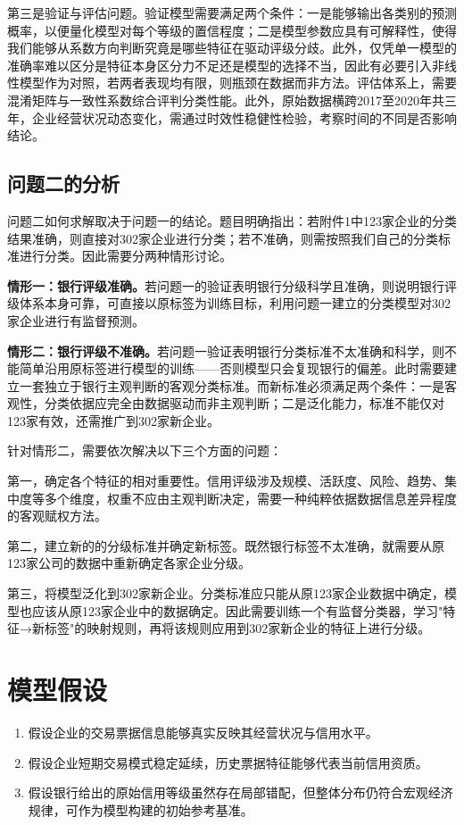 \documentclass[12pt,a4paper,AutoFakeBold=2]{ctexart}
\begin{document}
第三是验证与评估问题。验证模型需要满足两个条件：一是能够输出各类别的预测概率，以便量化模型对每个等级的置信程度；二是模型参数应具有可解释性，使得我们能够从系数方向判断究竟是哪些特征在驱动评级分歧。此外，仅凭单一模型的准确率难以区分是特征本身区分力不足还是模型的选择不当，因此有必要引入非线性模型作为对照，若两者表现均有限，则瓶颈在数据而非方法。评估体系上，需要混淆矩阵与一致性系数综合评判分类性能。此外，原始数据横跨2017至2020年共三年，企业经营状况动态变化，需通过时效性稳健性检验，考察时间的不同是否影响结论。

\subsection{问题二的分析}

问题二如何求解取决于问题一的结论。题目明确指出：若附件1中123家企业的分类结果准确，则直接对302家企业进行分类；若不准确，则需按照我们自己的分类标准进行分类。因此需要分两种情形讨论。

\textbf{情形一：银行评级准确。}若问题一的验证表明银行分级科学且准确，则说明银行评级体系本身可靠，可直接以原标签为训练目标，利用问题一建立的分类模型对302家企业进行有监督预测。

\textbf{情形二：银行评级不准确。}若问题一验证表明银行分类标准不太准确和科学，则不能简单沿用原标签进行模型的训练——否则模型只会复现银行的偏差。此时需要建立一套独立于银行主观判断的客观分类标准。而新标准必须满足两个条件：一是客观性，分类依据应完全由数据驱动而非主观判断；二是泛化能力，标准不能仅对123家有效，还需推广到302家新企业。

针对情形二，需要依次解决以下三个方面的问题：

第一，确定各个特征的相对重要性。信用评级涉及规模、活跃度、风险、趋势、集中度等多个维度，权重不应由主观判断决定，需要一种纯粹依据数据信息差异程度的客观赋权方法。

第二，建立新的的分级标准并确定新标签。既然银行标签不太准确，就需要从原123家公司的数据中重新确定各家企业分级。

第三，将模型泛化到302家新企业。分类标准应只能从原123家企业数据中确定，模型也应该从原123家企业中的数据确定。因此需要训练一个有监督分类器，学习"特征→新标签"的映射规则，再将该规则应用到302家新企业的特征上进行分级。

\section{模型假设}

\begin{enumerate}[label=\arabic*., leftmargin=2em]
\item 假设企业的交易票据信息能够真实反映其经营状况与信用水平。
\item 假设企业短期交易模式稳定延续，历史票据特征能够代表当前信用资质。
\item 假设银行给出的原始信用等级虽然存在局部错配，但整体分布仍符合宏观经济规律，可作为模型构建的初始参考基准。
\end{enumerate}
\end{document}
